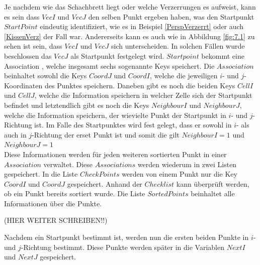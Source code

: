 Je nachdem wie das Schachbrett liegt oder welche Verzerrungen es aufweist, kann es sein dass $VecI$ und $VecJ$ den selben Punkt ergeben haben, was den Startpunkt $StartPoint$ eindeutig identifiziert, wie es in Beispiel \ref{PerspVerzerrt} oder auch \ref{KissenVerz} der Fall war. Andererseits kann es auch wie in Abbildung \ref{fig:7.1} zu sehen ist sein, dass $VecI$ und $VecJ$ sich unterscheiden. In solchen Fällen wurde beschlossen das $VecJ$ als Startpunkt festgelegt wird. $Startpoint$ bekommt eine Association \cite{Mathematica}, welche insgesamt sechs sogenannte Keys speichert. Die $Association$ beinhaltet sowohl die Keys $CoordJ$ und $CoordI$, welche die jeweiligen $i$- und $j$- Koordinaten des Punktes speichern. Daneben gibt es noch die beiden Keys $CellI$ und $CellJ$, welche die Information speichern in welcher Zelle sich der Startpunkt befindet und letztendlich gibt es noch die Keys $NeighbourI$ und $NeighbourJ$, welche die Information speichern, der wievielte Punkt der Startpunkt in $i$- und $j$-Richtung ist. Im Falle des Startpunktes wird fest gelegt, dass er sowohl in $i$- als auch in $j$-Richtung der erset Punkt ist und somit die gilt $NeighbourI = 1$ und $NeighbourJ = 1$\\

Diese Informationen werden für jeden weiteren sortierten Punkt in einer $Association$ verwaltet. Diese $Associations$ werden wiederum in zwei Listen gespeichert. In die Liste $CheckPoints$ werden von einem Punkt nur die Key $CoordI$ und $CoordJ$ gespeichert. Anhand der $Checklist$ kann überprüft werden, ob ein Punkt bereits sortiert wurde.  Die Liste $SortedPoints$ beinhaltet alle Informationen über die Punkte.  

(HIER WEITER SCHREIBEN!!)

Nachdem ein Startpunkt bestimmt ist, werden nun die ersten beiden Punkte in $i$-und $j$-Richtung bestimmt. Diese Punkte werden später in die Variablen $NextI$ und $NextJ$ gespeichert.








